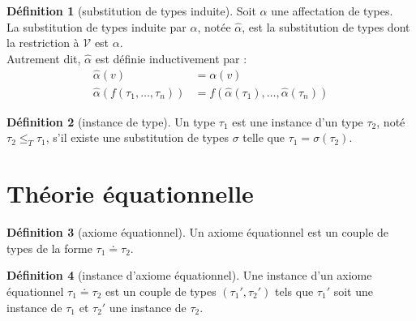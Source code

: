 \documentclass [a4paper,12pt] {article}
\theoremstyle {definition}
\newtheorem {definition} {Définition} [section]
\newcommand {\V} {\mathscr V}
\begin{document}
\begin {definition} [substitution de types induite]
	Soit $\alpha$ une affectation de types. \\
	La substitution de types induite par $\alpha$, notée $\hat \alpha$, est la substitution de types dont la restriction à $\V$ est $\alpha$. \\
	Autrement dit, $\hat \alpha$ est définie inductivement par :
	\begin {align*}
		\hat \alpha (v) &= \alpha (v) \\
		\hat \alpha (f (\tau_1, \dots, \tau_n)) &= f (\hat \alpha (\tau_1), \dots, \hat \alpha (\tau_n))
	\end {align*}
\end {definition}

\begin {definition} [instance de type]
	Un type $\tau_1$ est une instance d'un type $\tau_2$, noté $\tau_2 \leqslant_T \tau_1$, s'il existe une substitution de types $\sigma$  telle que $\tau_1 = \sigma (\tau_2)$.
\end {definition}


\section {Théorie équationnelle}

\begin {definition} [axiome équationnel]
	Un axiome équationnel est un couple de types de la forme $\tau_1 \doteq \tau_2$.
\end {definition}

\begin {definition} [instance d'axiome équationnel]
	Une instance d'un axiome équationnel $\tau_1 \doteq \tau_2$ est un couple de types $(\tau_1', \tau_2')$ tels que $\tau_1'$ soit une instance de $\tau_1$ et $\tau_2'$ une instance de $\tau_2$.
\end {definition}
\end{document}
